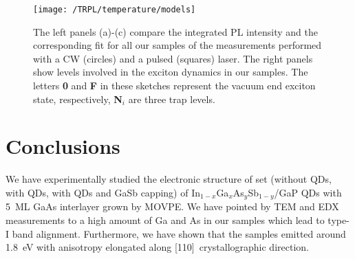 \begin{figure}
	\centering
	\texttt{[image: /TRPL/temperature/models]} %
	\caption{The left panels (a)-(c) compare the integrated PL intensity and the corresponding fit for all our samples of the measurements performed with a CW (circles) and a pulsed (squares) laser. The right panels show levels involved in the exciton dynamics in our samples. The letters \textbf{0} and \textbf{F} in these sketches represent the vacuum end exciton state, respectively, \textbf{N$_i$} are three trap levels.}
	\label{fig:Arrhenius_PLandTRPL}
\end{figure}
\newpage 

\section{Conclusions}
We have experimentally studied the electronic structure of set (without QDs, with QDs, with QDs and GaSb capping) of In$_{1-x}$Ga$_{x}$As$_y$Sb$_{1-y}$/GaP QDs with 5~ML GaAs interlayer grown by MOVPE. We have pointed by TEM and EDX measurements to a high amount of Ga and As in our samples which lead to type-I band alignment. Furthermore, we have shown that the samples emitted around 1.8~eV with anisotropy elongated along [110]~crystallographic direction.   %

{\color{red}{CO DÁL???}}